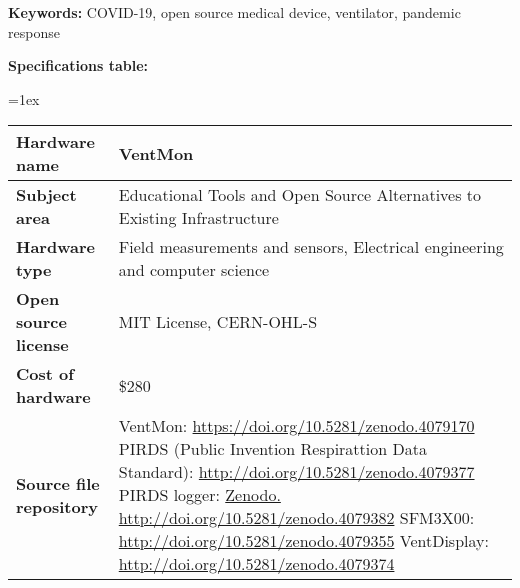 \documentclass[11pt, letterpaper]{article}
\begin{document}
\begin{flushleft}
\textbf{Keywords:} COVID-19, open source medical device, ventilator, pandemic response

\newpage
\textbf{Specifications table:}

\tabulinesep=1ex
\begin{tabu} to \linewidth {|X|X[3,l]|}
\hline  \textbf{Hardware name} &
  VentMon
  \\
  \hline \textbf{Subject area} & %
 Educational Tools and Open Source Alternatives to Existing Infrastructure
  \\
  \hline \textbf{Hardware type} &
Field measurements and sensors,
Electrical engineering and computer science
  \\
\hline \textbf{Open source license} &
 MIT License, CERN-OHL-S
  \\
\hline \textbf{Cost of hardware} &
\$280
  \\
  \hline \textbf{Source file repository} &

  VentMon: \linebreak
  \href{https://doi.org/10.5281/zenodo.4079170}{https://doi.org/10.5281/zenodo.4079170}
  \linebreak
  PIRDS (Public Invention Respirattion Data Standard): \linebreak
  \href{http://doi.org/10.5281/zenodo.4079377}{http://doi.org/10.5281/zenodo.4079377}
  \linebreak
  PIRDS logger: \linebreak
  \href{Zenodo. http://doi.org/10.5281/zenodo.4079382}{Zenodo. http://doi.org/10.5281/zenodo.4079382}
  \linebreak
  SFM3X00: \linebreak
  \href{http://doi.org/10.5281/zenodo.4079355}{http://doi.org/10.5281/zenodo.4079355} \linebreak
  VentDisplay: \linebreak
  \href{http://doi.org/10.5281/zenodo.4079374}{http://doi.org/10.5281/zenodo.4079374} \linebreak
  \linebreak


\end{tabu}
\end{flushleft}
\end{document}
